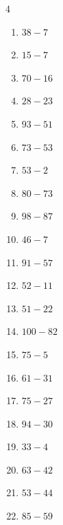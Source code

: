 \begin{multicols}{4}
\begin{enumerate}
  \item $38-7$
        \phantom{$=31$}

  \item $15-7$
        \phantom{$=8$}

  \item $70-16$
        \phantom{$=54$}

  \item $28-23$
        \phantom{$=5$}

  \item $93-51$
        \phantom{$=42$}

  \item $73-53$
        \phantom{$=20$}

  \item $53-2$
        \phantom{$=51$}

  \item $80-73$
        \phantom{$=7$}

  \item $98-87$
        \phantom{$=11$}

  \item $46-7$
        \phantom{$=39$}

  \item $91-57$
        \phantom{$=34$}

  \item $52-11$
        \phantom{$=41$}

  \item $51-22$
        \phantom{$=29$}

  \item $100-82$
        \phantom{$=18$}

  \item $75-5$
        \phantom{$=70$}

  \item $61-31$
        \phantom{$=30$}

  \item $75-27$
        \phantom{$=48$}

  \item $94-30$
        \phantom{$=64$}

  \item $33-4$
        \phantom{$=29$}

\columnbreak %

  \item $63-42$
        \phantom{$=21$}

  \item $53-44$
        \phantom{$=9$}

  \item $85-59$
        \phantom{$=26$}


\end{enumerate}
\end{multicols}
